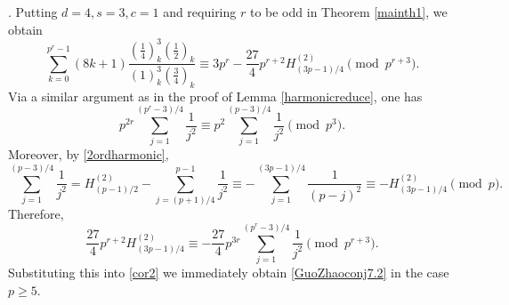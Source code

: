 \documentclass[12pt,reqno]{amsart}
\def\f{\frac}
\def\eq{\equiv}
\theoremstyle{plain}
\theoremstyle{definition}
\theoremstyle{remark}
\numberwithin{equation}{section}
\begin{document}
\medskip

. Putting $d=4,s=3,c=1$ and requiring $r$ to be odd in Theorem \ref{mainth1}, we obtain
\begin{equation}\label{cor2}
\sum_{k=0}^{p^r-1}(8k+1)\f{(\f14)_k^3(\f12)_k}{(1)_k^3(\f34)_k}\eq 3p^r-\f{27}{4}p^{r+2}H_{(3p-1)/4}^{(2)} \pmod{p^{r+3}}.
\end{equation}
Via a similar argument as in the proof of Lemma \ref{harmonicreduce}, one has 
$$
p^{2r}\sum_{j=1}^{(p^r-3)/4}\f{1}{j^2}\eq p^2\sum_{j=1}^{(p-3)/4}\f{1}{j^2}\pmod{p^3}.
$$
Moreover, by \eqref{2ordharmonic},
$$
\sum_{j=1}^{(p-3)/4}\f{1}{j^2}=H_{(p-1)/2}^{(2)}-\sum_{j=(p+1)/4}^{p-1}\f{1}{j^2}\eq-\sum_{j=1}^{(3p-1)/4}\f{1}{(p-j)^2}\eq -H_{(3p-1)/4}^{(2)} \pmod{p}.
$$
Therefore,
$$
\f{27}{4}p^{r+2}H_{(3p-1)/4}^{(2)} \eq -\f{27}{4}p^{3r}\sum_{j=1}^{(p^r-3)/4}\f{1}{j^2}\pmod{p^{r+3}}.
$$
Substituting this into \eqref{cor2} we immediately obtain \eqref{GuoZhaoconj7.2} in the case $p\geq5$.
\end{document}
